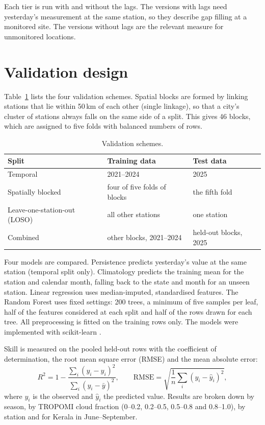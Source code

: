 Each tier is run with and without the \pmtf{} lags. The versions with lags need yesterday's
measurement at the same station, so they describe gap filling at a monitored site. The versions
without lags are the relevant measure for unmonitored locations.

\section{Validation design}

Table~\ref{tab:splits} lists the four validation schemes. Spatial blocks are formed by linking
stations that lie within 50\,km of each other (single linkage), so that a city's cluster of stations
always falls on the same side of a split. This gives 46 blocks, which are assigned to five folds
with balanced numbers of rows.

\begin{table}[!htbp]
    \centering
    \small
    \setlength{\tabcolsep}{4pt}
    \begin{tabular}{l|l|l}
        \hline
        Split & Training data & Test data \\
        \hline
        Temporal & 2021--2024 & 2025 \\
        Spatially blocked & four of five folds of blocks & the fifth fold \\
        Leave-one-station-out (LOSO) & all other stations & one station \\
        Combined & other blocks, 2021--2024 & held-out blocks, 2025 \\
        \hline
    \end{tabular}
    \caption{Validation schemes.}
    \label{tab:splits}
\end{table}

Four models are compared. Persistence predicts yesterday's value at the same station (temporal
split only). Climatology predicts the training mean for the station and calendar month, falling
back to the state and month for an unseen station. Linear regression uses median-imputed,
standardised features. The Random Forest \cite{breiman2001rf} uses fixed settings: 200 trees,
a minimum of five samples per leaf, half of the features considered at each split and half of the
rows drawn for each tree. All preprocessing is fitted on the training rows only. The models were
implemented with scikit-learn \cite{pedregosa2011sklearn}.

Skill is measured on the pooled held-out rows with the coefficient of determination, the root mean
square error (RMSE) and the mean absolute error:
\begin{equation}\label{eq:r2}
R^2 = 1 - \frac{\sum_i (y_i - \hat{y}_i)^2}{\sum_i (y_i - \bar{y})^2}, \qquad
\mathrm{RMSE} = \sqrt{\frac{1}{n}\sum_i (y_i - \hat{y}_i)^2},
\end{equation}
where $y_i$ is the observed and $\hat{y}_i$ the predicted value. Results are broken down by season,
by TROPOMI cloud fraction (0--0.2, 0.2--0.5, 0.5--0.8 and 0.8--1.0), by station and for Kerala in
June--September.

